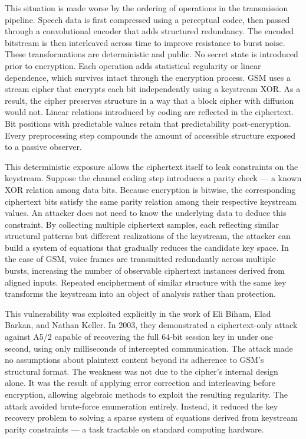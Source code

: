 This situation is made worse by the ordering of operations in the transmission pipeline. Speech data is first compressed using a perceptual codec, then passed through a convolutional encoder that adds structured redundancy. The encoded bitstream is then interleaved across time to improve resistance to burst noise. These transformations are deterministic and public. No secret state is introduced prior to encryption. Each operation adds statistical regularity or linear dependence, which survives intact through the encryption process. GSM uses a stream cipher that encrypts each bit independently using a keystream XOR. As a result, the cipher preserves structure in a way that a block cipher with diffusion would not. Linear relations introduced by coding are reflected in the ciphertext. Bit positions with predictable values retain that predictability post-encryption. Every preprocessing step compounds the amount of accessible structure exposed to a passive observer.

This deterministic exposure allows the ciphertext itself to leak constraints on the keystream. Suppose the channel coding step introduces a parity check — a known XOR relation among data bits. Because encryption is bitwise, the corresponding ciphertext bits satisfy the same parity relation among their respective keystream values. An attacker does not need to know the underlying data to deduce this constraint. By collecting multiple ciphertext samples, each reflecting similar structural patterns but different realizations of the keystream, the attacker can build a system of equations that gradually reduces the candidate key space. In the case of GSM, voice frames are transmitted redundantly across multiple bursts, increasing the number of observable ciphertext instances derived from aligned inputs. Repeated encipherment of similar structure with the same key transforms the keystream into an object of analysis rather than protection.

This vulnerability was exploited explicitly in the work of Eli Biham, Elad Barkan, and Nathan Keller. In 2003, they demonstrated a ciphertext-only attack against A5/2 capable of recovering the full 64-bit session key in under one second, using only milliseconds of intercepted communication. The attack made no assumptions about plaintext content beyond its adherence to GSM’s structural format. The weakness was not due to the cipher’s internal design alone. It was the result of applying error correction and interleaving before encryption, allowing algebraic methods to exploit the resulting regularity. The attack avoided brute-force enumeration entirely. Instead, it reduced the key recovery problem to solving a sparse system of equations derived from keystream parity constraints — a task tractable on standard computing hardware.

